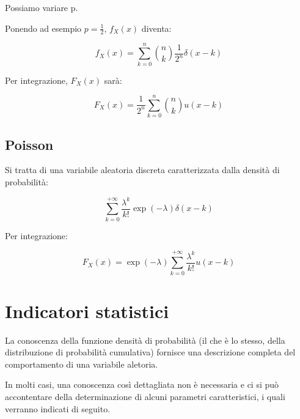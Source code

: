 Possiamo variare p. \newline 

Ponendo ad esempio $p=\frac{1}{2}$, $f_X (x)$ diventa: 

{
    \Large 
    \begin{equation}
        f_X (x) 
        = 
        \sum_{k = 0}^{n}
        \binom{n}{k}
        \frac{1}{2^{n}}
        \delta(x - k)
    \end{equation}
}

Per integrazione, $F_X (x)$ sarà: 

{
    \Large 
    \begin{equation}
        F_X (x) 
        = 
        \frac{1}{2^{n}}
        \sum_{k=0}^{n}
        \binom{n}{k}
        u(x - k)
    \end{equation}
}

\subsection{Poisson} 

Si tratta di una variabile aleatoria discreta caratterizzata dalla densità di probabilità: 

{
    \Large 
    \begin{equation}
        \sum_{k = 0}^{+ \infty}
        \frac{\lambda ^{k}}{k !}
        \exp(- \lambda)
        \delta(x-k)
    \end{equation}
}

Per integrazione: 

{
    \Large 
    \begin{equation}
        F_X (x) = \exp(-\lambda) \sum_{k = 0}^{+ \infty}
        \frac{\lambda^{k}}{k !} 
        u(x - k)
    \end{equation}
}

\newpage

\section{Indicatori statistici} 

La conoscenza della funzione densità di probabilità (il che è lo stesso, della distribuzione di probabilità cumulativa) 
fornisce una descrizione completa del comportamento di una variabile aletoria. \newline 

In molti casi, una conoscenza così dettagliata non è necessaria e ci si può accontentare della determinazione di alcuni parametri caratteristici, 
i quali verranno indicati di seguito. \newline 

